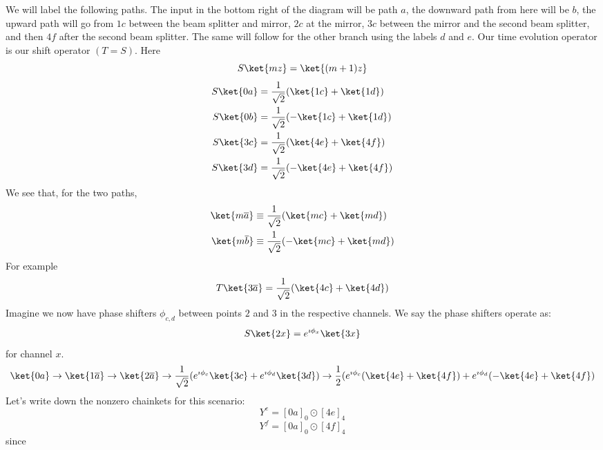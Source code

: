 \documentclass[a4paper,twoside,master.tex]{subfiles}
\begin{document}
We will label the following paths. The input in the bottom right of the diagram will be path $a$, the downward path from here will be $b$, the upward path will go from $1c$ between the beam splitter and mirror, $2c$ at the mirror, $3c$ between the mirror and the second beam splitter, and then $4f$ after the second beam splitter. The same will follow for the other branch using the labels $d$ and $e$. Our time evolution operator is our shift operator $(T=S)$. Here
\begin{equation}
    S\ket{mz} = \ket{(m+1)z}
\end{equation}
\begin{align}
    S\ket{0a} &= \frac{1}{\sqrt{2}}(\ket{1c}+\ket{1d})\\
    S\ket{0b} &= \frac{1}{\sqrt{2}} (-\ket{1c}+\ket{1d})\\
    S\ket{3c} &= \frac{1}{\sqrt{2}} (\ket{4e} + \ket{4f} )\\
    S\ket{3d} &= \frac{1}{\sqrt{2}} (-\ket{4e}+\ket{4f})
\end{align}
We see that, for the two paths,
\begin{align}
    \ket{m \overline{a}} &\equiv \frac{1}{\sqrt{2}} (\ket{mc} + \ket{md})\\
    \ket{m \overline{b}} &\equiv \frac{1}{\sqrt{2}} (-\ket{mc} + \ket{md})
\end{align}
For example
\begin{equation}
    T\ket{3 \overline{a}} = \frac{1}{\sqrt{2}} (\ket{4c} + \ket{4d})
\end{equation}
Imagine we now have phase shifters $\phi_{c,d}$ between points $2$ and $3$ in the respective channels. We say the phase shifters operate as:
\begin{equation}
    S\ket{2x} = e^{\imath\phi_x}\ket{3x}
\end{equation}
for channel $x$.
\begin{equation}
    \ket{0a} \to \ket{1 \overline{a}} \to \ket{2 \overline{a}} \to \frac{1}{\sqrt{2}} (e^{\imath\phi_c} \ket{3c} + e^{\imath\phi_d} \ket{3d}) \to \frac{1}{2} (e^{\imath\phi_c} (\ket{4e} + \ket{4f}) + e^{\imath\phi_d} (-\ket{4e} + \ket{4f})
\end{equation}
Let's write down the nonzero chainkets for this scenario:
\begin{equation}
    Y^e = [0a]_0 \odot [4e]_4
\end{equation}
\begin{equation}
    Y^f = [0a]_0 \odot [4f]_4
\end{equation}
since
\end{document}
